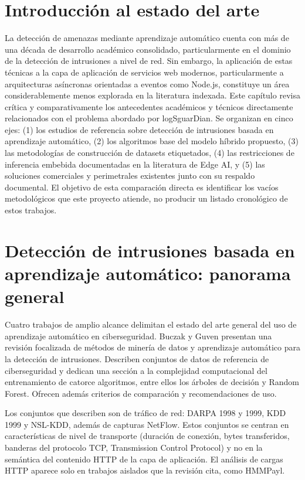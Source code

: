 \section{Introducción al estado del arte}

La detección de amenazas mediante aprendizaje automático cuenta con más de una década de desarrollo académico consolidado, particularmente en el dominio de la detección de intrusiones a nivel de red. Sin embargo, la aplicación de estas técnicas a la capa de aplicación de servicios web modernos, particularmente a arquitecturas asíncronas orientadas a eventos como Node.js, constituye un área considerablemente menos explorada en la literatura indexada. Este capítulo revisa crítica y comparativamente los antecedentes académicos y técnicos directamente relacionados con el problema abordado por logSguarDian. Se organizan en cinco ejes: (1) los estudios de referencia sobre detección de intrusiones basada en aprendizaje automático, (2) los algoritmos base del modelo híbrido propuesto, (3) las metodologías de construcción de datasets etiquetados, (4) las restricciones de inferencia embebida documentadas en la literatura de Edge AI, y (5) las soluciones comerciales y perimetrales existentes junto con su respaldo documental. El objetivo de esta comparación directa es identificar los vacíos metodológicos que este proyecto atiende, no producir un listado cronológico de estos trabajos.

\section{Detección de intrusiones basada en aprendizaje automático: panorama general}

Cuatro trabajos de amplio alcance delimitan el estado del arte general del uso de aprendizaje automático en ciberseguridad. Buczak y Guven \cite{buczak2016} presentan una revisión focalizada de métodos de minería de datos y aprendizaje automático para la detección de intrusiones. Describen conjuntos de datos de referencia de ciberseguridad y dedican una sección a la complejidad computacional del entrenamiento de catorce algoritmos, entre ellos los árboles de decisión y Random Forest. Ofrecen además criterios de comparación y recomendaciones de uso.

Los conjuntos que describen son de tráfico de red: DARPA 1998 y 1999, KDD 1999 y NSL-KDD, además de capturas NetFlow. Estos conjuntos se centran en características de nivel de transporte (duración de conexión, bytes transferidos, banderas del protocolo TCP, Transmission Control Protocol) y no en la semántica del contenido HTTP de la capa de aplicación. El análisis de cargas HTTP aparece solo en trabajos aislados que la revisión cita, como HMMPayl.

